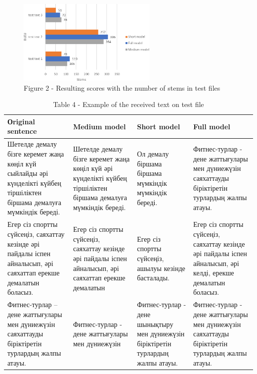 \begin{figure}[H]
	\centering
	\includegraphics[width=0.6\textwidth]{assets/56}
	\caption*{Figure 2 - Resulting scores with the number of stems in test files}
\end{figure}

\begin{table}[H]
\caption*{Table 4 - Example of the received text on test file}
\centering
\begin{tabular}{|p{}|p{}|p{}|p{}|}
\hline
Оriginal sentence & Medium model & Short model & Full model \\ \hline
Шетелде демалу бізге керемет жаңа көңіл күй сыйлайды әрі күнделікті күйбең тіршіліктен біршама демалуға мүмкіндік береді. & Шетелде демалу бізге керемет жаңа көңіл күй әрі күнделікті күйбең тіршіліктен біршама демалуға мүмкіндік береді. & Ол демалу біршама біршама мүмкіндік мүмкіндік береді. & Фитнес-турлар - дене жаттығулары мен дүниежүзін саяхаттауды біріктіретін турлардың жалпы атауы. \\ \hline
Егер сіз спортты сүйсеңіз, саяхаттау кезінде әрі пайдалы іспен айналысып, әрі саяхаттап ерекше демалатын боласыз. & Егер сіз спортты сүйсеңіз, саяхаттау кезінде әрі пайдалы іспен айналысып, әрі саяхаттап ерекше демалатын & Егер сіз спортты сүйсеңіз, ашылуы кезінде басталады. & Егер сіз спортты сүйсеңіз, саяхаттау кезінде әрі пайдалы іспен айналысып, әрі келді, ерекше демалатын боласыз. \\ \hline
Фитнес-турлар – дене жаттығулары мен дүниежүзін саяхаттауды біріктіретін турлардың жалпы атауы. & Фитнес-турлар - дене жаттығулары мен дүниежүзін & Фитнес-турлар - дене шынықтыру мен дүниежүзін біріктіретін турлардың жалпы атауы. & Фитнес-турлар - дене жаттығулары мен дүниежүзін саяхаттауды біріктіретін турлардың жалпы атауы. \\ \hline
\end{tabular}
\end{table}

